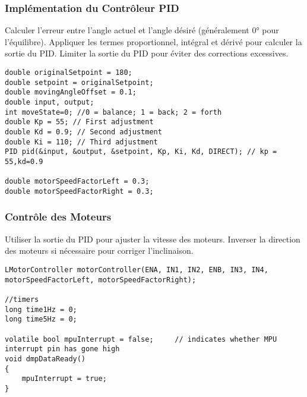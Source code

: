 \documentclass{report}
\begin{document}
\subsubsection{Implémentation du Contrôleur PID}
Calculer l'erreur entre l'angle actuel et l'angle désiré (généralement 0° pour l'équilibre).
Appliquer les termes proportionnel, intégral et dérivé pour calculer la sortie du PID.
Limiter la sortie du PID pour éviter des corrections excessives.
\begin{verbatim}
double originalSetpoint = 180; 
double setpoint = originalSetpoint;
double movingAngleOffset = 0.1;
double input, output;
int moveState=0; //0 = balance; 1 = back; 2 = forth
double Kp = 55; // First adjustment
double Kd = 0.9; // Second adjustment
double Ki = 110; // Third adjustment
PID pid(&input, &output, &setpoint, Kp, Ki, Kd, DIRECT); // kp = 55,kd=0.9

double motorSpeedFactorLeft = 0.3;
double motorSpeedFactorRight = 0.3;
\end{verbatim}
\subsubsection{Contrôle des Moteurs}
Utiliser la sortie du PID pour ajuster la vitesse des moteurs.
Inverser la direction des moteurs si nécessaire pour corriger l'inclinaison.
\begin{verbatim}
LMotorController motorController(ENA, IN1, IN2, ENB, IN3, IN4, motorSpeedFactorLeft, motorSpeedFactorRight);

//timers
long time1Hz = 0;
long time5Hz = 0;

volatile bool mpuInterrupt = false;     // indicates whether MPU interrupt pin has gone high
void dmpDataReady()
{
    mpuInterrupt = true;
}
\end{verbatim}
\end{document}

